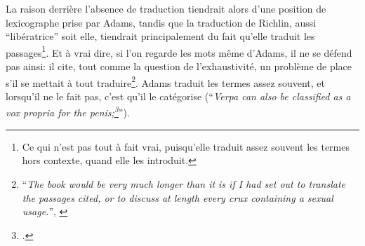 La raison derrière l'absence de traduction tiendrait alors d'une position de lexicographe prise par Adams, tandis que la traduction de Richlin, aussi \enquote{libératrice} soit elle, tiendrait principalement du fait qu'elle traduit les passages\footnote{Ce qui n'est pas tout à fait vrai, puisqu'elle traduit assez souvent les termes hors contexte, quand elle les introduit.}. Et à vrai dire, si l'on regarde les mots même d'Adams, il ne se défend pas ainsi: il cite, tout comme la question de l'exhaustivité, un problème de place s'il se mettait à tout traduire\footnote{\enquote{\textit{The book would be very much longer than it is if I had set out to translate the passages cited, or to discuss at length every crux containing a sexual usage.}}, \textcite[p.~VII]{adams}}. Adams traduit les termes assez souvent, et lorsqu'il ne le fait pas, c'est qu'il le catégorise (\enquote{\textit{Verpa can also be classified as a vox propria for the penis;\footcite[p.~12]{adams}}}).



